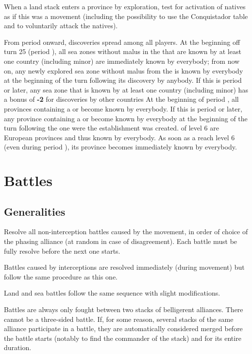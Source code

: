 When a land stack enters a province by exploration, test for activation of
natives as if this was a movement (including the possibility to use the
Conquistador table and to voluntarily attack the natives).

\bparag From period  onward, discoveries spread among all players.
\bparag[Atlantic] At the beginning off turn 25 (period ), all sea
zones without malus in the  that are known by at least one
country (including minor) are immediately known by everybody; from now on, any
newly explored sea zone without malus from the  is known by
everybody at the beginning of the turn following its discovery by anybody.
\bparag[On sea] If this is period  or later, any sea zone that is
known by at least one country (including minor) has a bonus of {\bf -2} for
discoveries by other countries
\bparag [On land] At the beginning of period , all provinces
containing a \COL or \TP become known by everybody.
\bparag [On land] If this is period  or later, any province
containing a \COL or \TP become known by everybody at the beginning of the
turn following the one were the establishment was created.
\bparag[Level 6] \COL of level 6 are European provinces and thus known by
everybody. As soon as a \COL reach level 6 (even during period ),
its province becomes immediately known by everybody.

\section{Battles}
\label{chMilitary:Battles}
\subsection{Generalities}
Resolve all non-interception battles caused by the movement, in order of
choice of the phasing alliance (at random in case of disagreement). Each
battle must be fully resolve before the next one starts.

Battles caused by interceptions are resolved immediately (during movement) but
follow the same procedure as this one.

Land and sea battles follow the same sequence with slight modifications.

Battles are always only fought between two stacks of belligerent
alliances. There cannot be a three-sided battle. If, for some reason, several
stacks of the same alliance participate in a battle, they are automatically
considered merged before the battle starts (notably to find the commander of
the stack) and for its entire duration.

